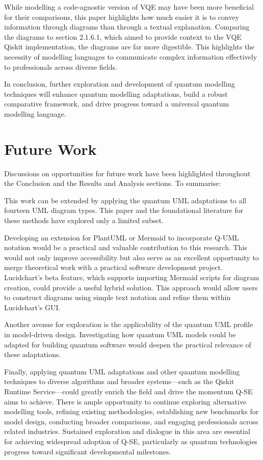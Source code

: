 \documentclass{article}
\begin{document}
While modelling a code-agnostic version of VQE may have been more beneficial for their comparisons, this paper highlights how much easier it is to convey information through diagrams than through a textual explanation. Comparing the diagrams to section 2.1.6.1, which aimed to provide context to the VQE Qiskit implementation, the diagrams are far more digestible. This highlights the necessity of modelling languages to communicate complex information effectively to professionals across diverse fields.

In conclusion, further exploration and development of quantum modelling techniques will enhance quantum modelling adaptations, build a robust comparative framework, and drive progress toward a universal quantum modelling language.

\section{Future Work}

Discussions on opportunities for future work have been highlighted throughout the Conclusion and the Results and Analysis sections. To summarise:

This work can be extended by applying the quantum UML adaptations to all fourteen UML diagram types. This paper and the foundational literature for these methods have explored only a limited subset.

Developing an extension for PlantUML or Mermaid to incorporate Q-UML notation would be a practical and valuable contribution to this research. This would not only improve accessibility but also serve as an excellent opportunity to merge theoretical work with a practical software development project. Lucidchart's beta feature, which supports importing Mermaid scripts for diagram creation, could provide a useful hybrid solution. This approach would allow users to construct diagrams using simple text notation and refine them within Lucidchart's GUI.

Another avenue for exploration is the applicability of the quantum UML profile in model-driven design. Investigating how quantum UML models could be adapted for building quantum software would deepen the practical relevance of these adaptations.

Finally, applying quantum UML adaptations and other quantum modelling techniques to diverse algorithms and broader systems—such as the Qiskit Runtime Service—could greatly enrich the field and drive the momentum Q-SE aims to achieve. There is ample opportunity to continue exploring alternative modelling tools, refining existing methodologies, establishing new benchmarks for model design, conducting broader comparisons, and engaging professionals across related industries. Sustained exploration and dialogue in this area are essential for achieving widespread adoption of Q-SE, particularly as quantum technologies progress toward significant developmental milestones.
\end{document}
